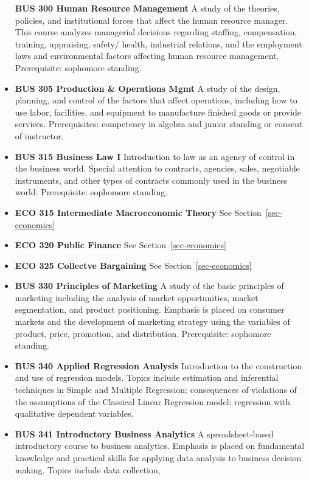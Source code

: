 \documentclass[
  letterpaper,
]{scrbook}
\begin{document}
\begin{itemize}
  \textbf{BUS 300 Human Resource Management} A study of the theories,
  policies, and institutional forces that affect the human resource
  manager. This course analyzes managerial decisions regarding staffing,
  compensation, training, appraising, safety/ health, industrial
  relations, and the employment laws and environmental factors affecting
  human resource management. Prerequisite: sophomore standing.
\item
  \textbf{BUS 305 Production \& Operations Mgmt} A study of the design,
  planning, and control of the factors that affect operations, including
  how to use labor, facilities, and equipment to manufacture finished
  goods or provide services. Prerequisites: competency in algebra and
  junior standing or consent of instructor.
\item
  \textbf{BUS 315 Business Law I} Introduction to law as an agency of
  control in the business world. Special attention to contracts,
  agencies, sales, negotiable instruments, and other types of contracts
  commonly used in the business world. Prerequisite: sophomore standing.
\item
  \textbf{ECO 315 Intermediate Macroeconomic Theory} See
  Section~\ref{sec-economics}
\item
  \textbf{ECO 320 Public Finance} See Section~\ref{sec-economics}
\item
  \textbf{ECO 325 Collectve Bargaining} See Section~\ref{sec-economics}
\item
  \textbf{BUS 330 Principles of Marketing} A study of the basic
  principles of marketing including the analysis of market
  opportunities, market segmentation, and product positioning. Emphasis
  is placed on consumer markets and the development of marketing
  strategy using the variables of product, price, promotion, and
  distribution. Prerequisite: sophomore standing.
\item
  \textbf{BUS 340 Applied Regression Analysis} Introduction to the
  construction and use of regression models. Topics include estimation
  and inferential techniques in Simple and Multiple Regression;
  consequences of violations of the assumptions of the Classical Linear
  Regression model; regression with qualitative dependent variables.
\item
  \textbf{BUS 341 Introductory Business Analytics} A spreadsheet-based
  introductory course to business analytics. Emphasis is placed on
  fundamental knowledge and practical skills for applying data analysis
  to business decision making. Topics include data collection,

\end{itemize}
\end{document}
